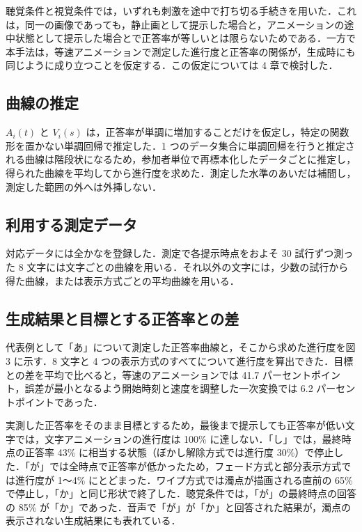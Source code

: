聴覚条件と視覚条件では，いずれも刺激を途中で打ち切る手続きを用いた．これは，同一の画像であっても，静止画として提示した場合と，アニメーションの途中状態として提示した場合とで正答率が等しいとは限らないためである．一方で本手法は，等速アニメーションで測定した進行度と正答率の関係が，生成時にも同じように成り立つことを仮定する．この仮定については 4 章で検討した．


\subsection{曲線の推定}

$A_i(t)$ と $V_i(s)$ は，正答率が単調に増加することだけを仮定し，特定の関数形を置かない単調回帰で推定した．1 つのデータ集合に単調回帰を行うと推定される曲線は階段状になるため，参加者単位で再標本化したデータごとに推定し，得られた曲線を平均してから進行度を求めた．測定した水準のあいだは補間し，測定した範囲の外へは外挿しない．


\subsection{利用する測定データ}

対応データには全かなを登録した．測定で各提示時点をおよそ 30 試行ずつ測った 8 文字には文字ごとの曲線を用いる．それ以外の文字には，少数の試行から得た曲線，または表示方式ごとの平均曲線を用いる．


\subsection{生成結果と目標とする正答率との差}

代表例として「あ」について測定した正答率曲線と，そこから求めた進行度を図 3 に示す．8 文字と 4 つの表示方式のすべてについて進行度を算出できた．目標との差を平均で比べると，等速のアニメーションでは 41.7 パーセントポイント，誤差が最小となるよう開始時刻と速度を調整した一次変換では 6.2 パーセントポイントであった．

実測した正答率をそのまま目標とするため，最後まで提示しても正答率が低い文字では，文字アニメーションの進行度は 100\% に達しない．「し」では，最終時点の正答率 43\% に相当する状態（ぼかし解除方式では進行度 30\%）で停止した．「が」では全時点で正答率が低かったため，フェード方式と部分表示方式では進行度が 1〜4\% にとどまった．ワイプ方式では濁点が描画される直前の 65\% で停止し，「か」と同じ形状で終了した．聴覚条件では，「が」の最終時点の回答の 85\% が「か」であった．音声で「が」が「か」と回答された結果が，濁点の表示されない生成結果にも表れている．


